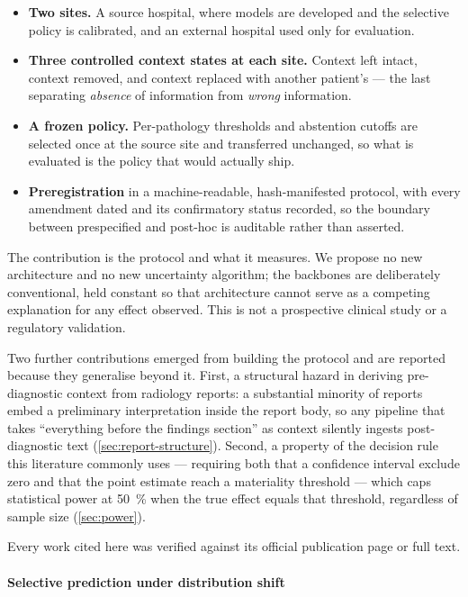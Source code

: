 \begin{itemize}
  \item \textbf{Two sites.} A source hospital, where models are developed and
    the selective policy is calibrated, and an external hospital used only for
    evaluation.
  \item \textbf{Three controlled context states at each site.} Context left
    intact, context removed, and context replaced with another patient's ---
    the last separating \emph{absence} of information from \emph{wrong}
    information.
  \item \textbf{A frozen policy.} Per-pathology thresholds and abstention
    cutoffs are selected once at the source site and transferred unchanged, so
    what is evaluated is the policy that would actually ship.
  \item \textbf{Preregistration} in a machine-readable, hash-manifested
    protocol, with every amendment dated and its confirmatory status recorded,
    so the boundary between prespecified and post-hoc is auditable rather than
    asserted.
\end{itemize}

The contribution is the protocol and what it measures. We propose no new
architecture and no new uncertainty algorithm; the backbones are deliberately
conventional, held constant so that architecture cannot serve as a competing
explanation for any effect observed. This is not a prospective clinical study or
a regulatory validation.

Two further contributions emerged from building the protocol and are reported
because they generalise beyond it. First, a structural hazard in deriving
pre-diagnostic context from radiology reports: a substantial minority of reports
embed a preliminary interpretation inside the report body, so any pipeline that
takes ``everything before the findings section'' as context silently ingests
post-diagnostic text (\cref{sec:report-structure}). Second, a property of the
decision rule this literature commonly uses --- requiring both that a confidence
interval exclude zero and that the point estimate reach a materiality threshold
--- which caps statistical power at \SI{50}{\percent} when the true effect
equals that threshold, regardless of sample size (\cref{sec:power}).

\label{sec:related-work}

Every work cited here was verified against its official publication page or
full text.

\paragraph{Selective prediction under distribution shift}

